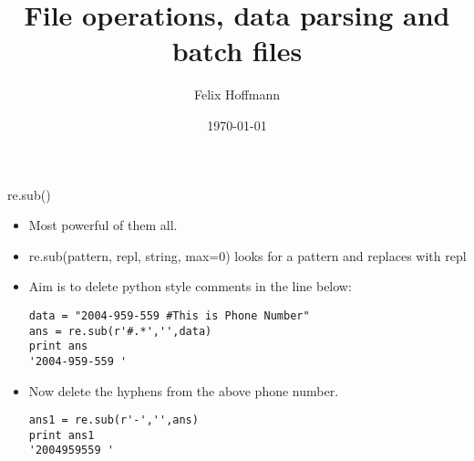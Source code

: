 \documentclass[xcolor=table,10pt]{beamer}
\title {File operations, data parsing and batch files}
\author[Felix Hoffmann]{Felix Hoffmann}
\institute[BCF]{Bernstein Center Freiburg}
\date{\today}
\begin{document}


























\begin{frame}[fragile]{re.sub()}
\begin{itemize}
\item Most powerful of them all.
\item re.sub(pattern, repl, string, max=0) looks for a pattern and replaces with repl
\item Aim is to delete python style comments in the line below:\\

\begin{verbatim}
data = "2004-959-559 #This is Phone Number"
ans = re.sub(r'#.*','',data)
print ans
'2004-959-559 '
\end{verbatim}
\small
\item Now delete the hyphens from the above phone number.\\

\begin{verbatim}
ans1 = re.sub(r'-','',ans)
print ans1
'2004959559 '
\end{verbatim}
\end{itemize}
\end{frame}
\end{document}
